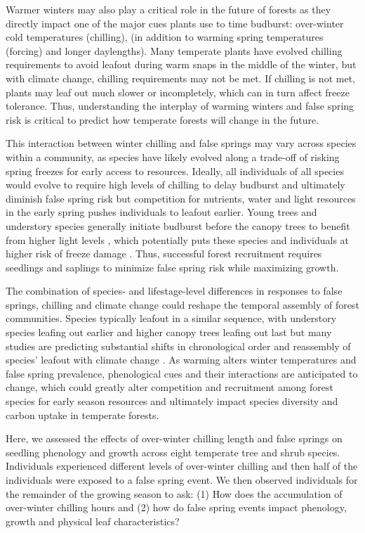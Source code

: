 \documentclass{article}\usepackage[]{graphicx}\usepackage[]{color}
\begin{document}
Warmer winters may also play a critical role in the future of forests as they directly impact one of the  major cues plants use to time budburst: over-winter cold temperatures (chilling), (in addition to warming spring temperatures (forcing) and longer daylengths). Many temperate plants have evolved chilling requirements to avoid leafout during warm snaps in the middle of the winter, but with climate change, chilling requirements may not be met. If chilling is not met, plants may leaf out much slower or incompletely, which can in turn affect freeze tolerance. Thus, understanding the interplay of warming winters and false spring risk is critical to predict how temperate forests will change in the future.
  
This interaction between winter chilling and false springs may vary across species within a community, as species have likely evolved along a trade-off of risking spring freezes for early access to resources. Ideally, all individuals of all species would evolve to require high levels of chilling to delay budburst and ultimately diminish false spring risk but competition for nutrients, water and light resources in the early spring pushes individuals to leafout earlier. Young trees and understory species generally initiate budburst before the canopy trees to benefit from higher light levels \citep {Augspurger2008, Vitasse2013}, which potentially puts these species and individuals at higher risk of freeze damage \citep{Vitasse2014}. Thus, successful forest recruitment requires seedlings and saplings to minimize false spring risk while maximizing growth.
 
The combination of species- and lifestage-level differences in responses to false springs, chilling and climate change could reshape the temporal assembly of forest communities. Species typically leafout in a similar sequence, with understory species leafing out earlier and higher canopy trees leafing out last but many studies are predicting substantial shifts in chronological order and reassembly of species' leafout with climate change \citep{Roberts2015, Laube2014}. As warming alters winter temperatures and false spring prevalence, phenological cues and their interactions are anticipated to change, which could greatly alter competition and recruitment among forest species for early season resources and ultimately impact species diversity and carbon uptake in temperate forests.
  
Here, we assessed the effects of over-winter chilling length and false springs on seedling phenology and growth across eight temperate tree and shrub species. Individuals experienced different levels of over-winter chilling and then half of the individuals were exposed to a false spring event. We then observed individuals for the remainder of the growing season to ask: (1) How does the accumulation of over-winter chilling hours and (2) how do false spring events impact phenology, growth and physical leaf characteristics?
\end{document}
